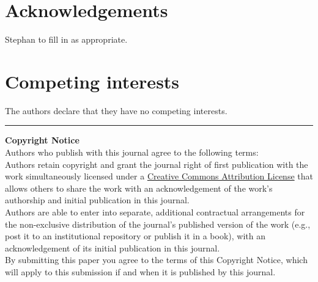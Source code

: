 \documentclass{jors}
\begin{document}
\section*{Acknowledgements}

Stephan to fill in as appropriate.

\section*{Competing interests}

The authors declare that they have no competing interests.



\vspace{2cm}

\rule{\textwidth}{1pt}

{ \bf Copyright Notice} \\
Authors who publish with this journal agree to the following terms: \\

Authors retain copyright and grant the journal right of first publication with the work simultaneously licensed under a  \href{http://creativecommons.org/licenses/by/3.0/}{Creative Commons Attribution License} that allows others to share the work with an acknowledgement of the work's authorship and initial publication in this journal. \\

Authors are able to enter into separate, additional contractual arrangements for the non-exclusive distribution of the journal's published version of the work (e.g., post it to an institutional repository or publish it in a book), with an acknowledgement of its initial publication in this journal. \\

By submitting this paper you agree to the terms of this Copyright Notice, which will apply to this submission if and when it is published by this journal.
\end{document}
